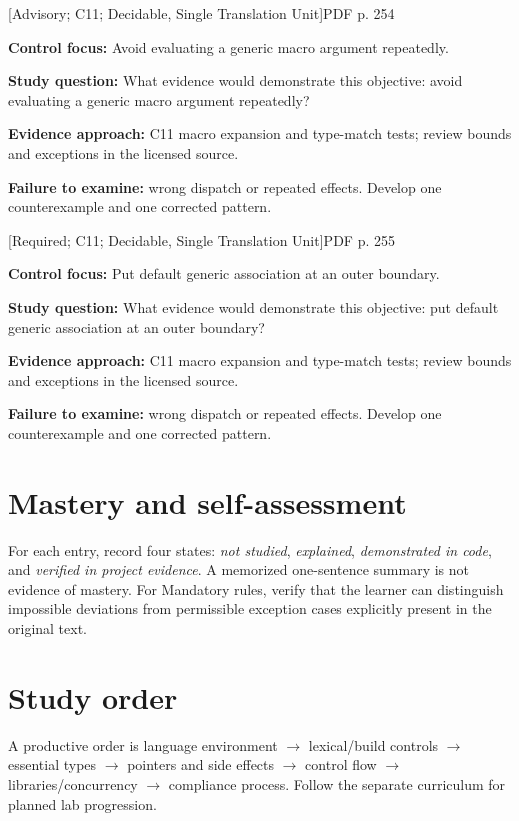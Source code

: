 \documentclass[10pt,letterpaper]{article}
\begin{document}
\smallskip
{}
 \textsf{\footnotesize [Advisory; C11; Decidable, Single Translation Unit]}\hfill{\footnotesize PDF p. 254}\par
\textbf{Control focus:} Avoid evaluating a generic macro argument repeatedly.\par
\textbf{Study question:} What evidence would demonstrate this objective: avoid evaluating a generic macro argument repeatedly?\par
\textbf{Evidence approach:} C11 macro expansion and type-match tests; review bounds and exceptions in the licensed source.\par
\textbf{Failure to examine:} wrong dispatch or repeated effects. Develop one counterexample and one corrected pattern.\par
\smallskip
{}
 \textsf{\footnotesize [Required; C11; Decidable, Single Translation Unit]}\hfill{\footnotesize PDF p. 255}\par
\textbf{Control focus:} Put default generic association at an outer boundary.\par
\textbf{Study question:} What evidence would demonstrate this objective: put default generic association at an outer boundary?\par
\textbf{Evidence approach:} C11 macro expansion and type-match tests; review bounds and exceptions in the licensed source.\par
\textbf{Failure to examine:} wrong dispatch or repeated effects. Develop one counterexample and one corrected pattern.\par
\smallskip

\section{Mastery and self-assessment}
For each entry, record four states: \emph{not studied}, \emph{explained}, \emph{demonstrated in code}, and \emph{verified in project evidence}. A memorized one-sentence summary is not evidence of mastery. For Mandatory rules, verify that the learner can distinguish impossible deviations from permissible exception cases explicitly present in the original text.
\section{Study order}
A productive order is language environment $\rightarrow$ lexical/build controls $\rightarrow$ essential types $\rightarrow$ pointers and side effects $\rightarrow$ control flow $\rightarrow$ libraries/concurrency $\rightarrow$ compliance process. Follow the separate curriculum for planned lab progression.
\end{document}
